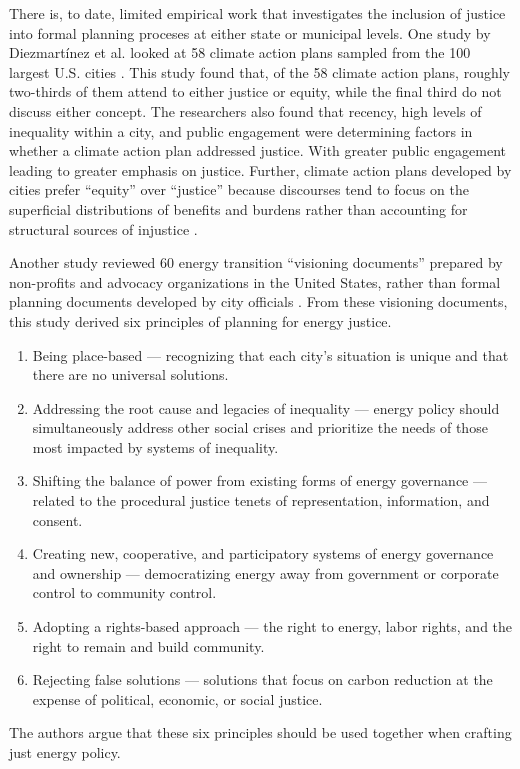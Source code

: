 There is, to date, limited empirical work that investigates the inclusion of
justice into formal planning proceses at either state or municipal levels. One
study by Diezmart\'inez et al. looked at 58 climate action plans sampled from
the 100 largest U.S. cities \cite{diezmartinez_us_2022}. This study found that,
of the 58 climate action plans, roughly two-thirds of them attend to either
justice or equity, while the final third do not discuss either concept. The
researchers also found that recency, high levels of inequality within a city,
and public engagement were determining factors in whether a climate action plan
addressed justice. With greater public engagement leading to greater emphasis on
justice. Further, climate action plans developed by cities prefer ``equity''
over ``justice'' because discourses tend to focus on the superficial
distributions of benefits and burdens rather than accounting for structural
sources of injustice \cite{diezmartinez_us_2022}.

Another study reviewed 60 energy transition ``visioning documents'' prepared by
non-profits and advocacy organizations in the United States, rather than formal
planning documents developed by city officials \cite{elmallah_frontlining_2022}.
From these visioning documents, this study derived six principles of planning
for energy justice.
\begin{enumerate}
    \item Being place-based --- recognizing that each city's situation is unique
    and that there are no universal solutions.
    \item Addressing the root cause and legacies of inequality --- energy policy
    should simultaneously address other social crises and prioritize the needs
    of those most impacted by systems of inequality.
    \item Shifting the balance of power from existing forms of energy governance
    --- related to the procedural justice tenets of representation, information,
    and consent.
    \item Creating new, cooperative, and participatory systems of energy
    governance and ownership --- democratizing energy away from government or
    corporate control to community control.
    \item Adopting a rights-based approach --- the right to energy, labor
    rights, and the right to remain and build community.
    \item Rejecting false solutions --- solutions that focus on carbon reduction
    at the expense of political, economic, or social justice.
\end{enumerate}
The authors argue that these six principles should be used together when
crafting just energy policy.

